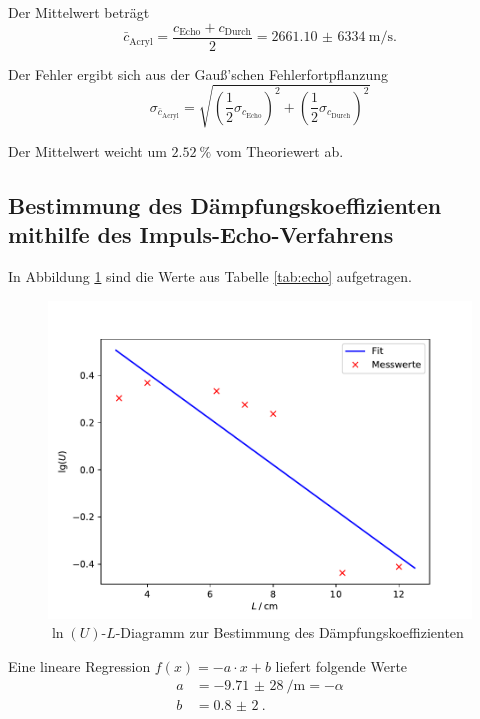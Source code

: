 Der Mittelwert beträgt
\begin{equation*}
  \bar{c}_\text{Acryl} = \frac{c_\text{Echo}+c_\text{Durch}}{2} = \SI{2661,10(6334)}{\m \per \s}.
\end{equation*}

Der Fehler ergibt sich aus der Gauß'schen Fehlerfortpflanzung
\begin{equation*}
  \sigma_{\bar{c}_\text{Acryl}} = \sqrt{\left( \frac{1}{2} \sigma_{c_\text{Echo}} \right)^2 + \left( \frac{1}{2} \sigma_{c_\text{Durch}} \right)^2}
\end{equation*}

Der Mittelwert weicht um $\SI{2,52}{\%}$ vom Theoriewert \cite{sample2} ab.

\subsection{Bestimmung des Dämpfungskoeffizienten mithilfe des Impuls-Echo-Verfahrens \label{sec:daem}}

In Abbildung \ref{fig:däm} sind die Werte aus Tabelle \ref{tab:echo} aufgetragen.
\begin{figure}[H]
  \centering
  \includegraphics[width=\textwidth]{Plots/daem.pdf}
  \caption{$\ln{(U)}$-$L$-Diagramm zur Bestimmung des Dämpfungskoeffizienten}
  \label{fig:däm}
\end{figure}

Eine lineare Regression $f(x) = -a \cdot x + b$ liefert folgende Werte
\begin{align*}
  a &= \SI{-9,71(28)}{\per \m} = - \alpha \\
  b &= \SI{0,8(2)}{}.
\end{align*}

